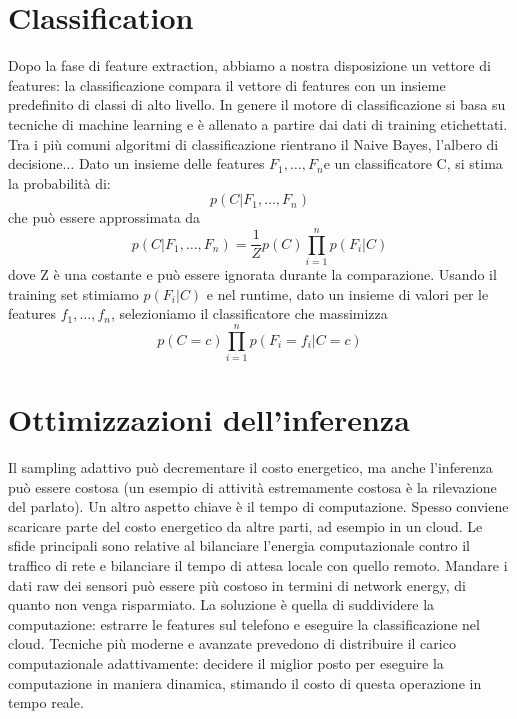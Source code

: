 \section{Classification}
Dopo la fase di feature extraction, abbiamo a nostra disposizione un vettore di
features: la classificazione compara il vettore di features con un insieme
predefinito di classi di alto livello. In genere il motore di classificazione si
basa su tecniche di machine learning e è allenato a partire dai dati di training
etichettati. Tra i più comuni algoritmi di classificazione rientrano il Naive
Bayes, l'albero di decisione$\ldots$
\bigbreak
Dato un insieme delle features $F_1, \ldots, F_n$e un classificatore C, si stima la
probabilità di:
\begin{equation}
p(C|F_1, \ldots, F_n)
\end{equation}
che può essere approssimata da
\begin{equation}
p(C|F_1,\ldots,F_n)=\frac{1}{Z}p(C)\prod_{i=1}^{n}p(F_i|C)
\end{equation}
dove Z è una costante e può essere ignorata durante la comparazione. Usando il
training set stimiamo $p(F_i|C)$ e nel runtime, dato un insieme di valori per le
features $f_1, \ldots, f_n$, selezioniamo il classificatore che massimizza
\begin{equation}
p(C=c)\prod_{i=1}^{n}p(F_i=f_i|C=c)
\end{equation}

\section{Ottimizzazioni dell'inferenza}
Il sampling adattivo può decrementare il costo energetico, ma anche l'inferenza
può essere costosa (un esempio di attività estremamente costosa è la
rilevazione del parlato). Un altro aspetto chiave è il tempo di computazione.
Spesso conviene scaricare parte del costo energetico da altre parti, ad esempio
in un cloud.
Le sfide principali sono relative al bilanciare l'energia computazionale contro
il traffico di rete e bilanciare il tempo di attesa locale con quello remoto.
Mandare i dati raw dei sensori può essere più costoso in termini di network
energy, di quanto non venga risparmiato. La soluzione è quella di suddividere la
computazione: estrarre le features sul telefono e eseguire la classificazione
nel cloud. Tecniche più moderne e avanzate prevedono di distribuire il carico
computazionale adattivamente: decidere il miglior posto per eseguire la
computazione in maniera dinamica, stimando il costo di questa operazione in tempo
reale.
